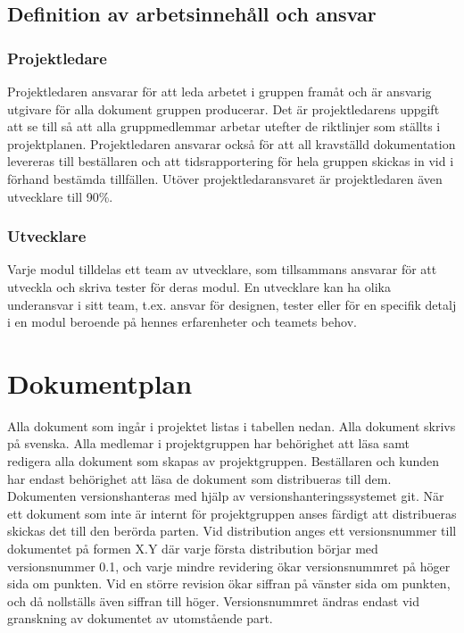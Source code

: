 \documentclass{article}
\begin{document}
\subsection{Definition av arbetsinnehåll och ansvar}
\subsubsection{Projektledare}
Projektledaren ansvarar för att leda arbetet i gruppen framåt och är ansvarig utgivare för alla dokument gruppen producerar. Det är projektledarens uppgift att se till så att alla gruppmedlemmar arbetar utefter de riktlinjer som ställts i projektplanen. Projektledaren ansvarar också för att all kravställd dokumentation levereras till beställaren och att tidsrapportering för hela gruppen skickas in vid i förhand bestämda tillfällen. Utöver projektledaransvaret är projektledaren även utvecklare till 90\%.

\subsubsection{Utvecklare}
Varje modul tilldelas ett team av utvecklare, som tillsammans ansvarar för att utveckla och skriva tester för deras modul. En utvecklare kan ha olika underansvar i sitt team, t.ex. ansvar för designen, tester eller för en specifik detalj i en modul beroende på hennes erfarenheter och teamets behov.

\section{Dokumentplan}

Alla dokument som ingår i projektet listas i tabellen nedan. Alla dokument skrivs på svenska. Alla medlemar i projektgruppen har behörighet att läsa samt redigera alla dokument som skapas av projektgruppen. Beställaren och kunden har endast behörighet att läsa de dokument som distribueras till dem. Dokumenten versionshanteras med hjälp av versionshanteringssystemet git. När ett dokument som inte är internt för projektgruppen anses färdigt att distribueras skickas det till den berörda parten. Vid distribution anges ett versionsnummer till dokumentet på formen X.Y där varje första distribution börjar med versionsnummer 0.1, och varje mindre revidering ökar versionsnummret på höger sida om punkten. Vid en större revision ökar siffran på vänster sida om punkten, och då nollställs även siffran till höger. Versionsnummret ändras endast vid granskning av dokumentet av utomstående part.
\end{document}

